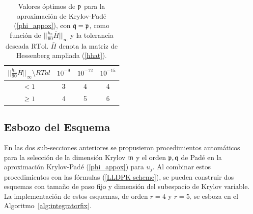 \begin{table}[htb]
	\caption{Valores óptimos de $\mathfrak{p}$ para la aproximación de Krylov-Padé (\ref{phi_appox}), con $\mathfrak{q}=\mathfrak{p}$, como función de $\lvert\lvert \frac{h_n}{90}\overline{H} \rvert\rvert_\infty$ y la tolerancia deseada $\mathrm{RTol}$. $\overline{H}$ denota la matriz de Hessenberg ampliada (\ref{hhat}).}
	\begin{center}
		\begin{tabular}{cccc}
			\hline
			$\lvert\lvert \frac{h_n}{90}\overline{H} \rvert\rvert_\infty \setminus RTol$ & $10^{-9}$ & $10^{-12}$ & $10^{-15}$ \\
			\hline
			$<1$ & 3 & 4 & 4 \\
			$\geq 1$ & 4 & 5 & 6 \\
			\hline
		\end{tabular}
		\label{table:padep}
	\end{center}
\end{table}

\subsection{Esbozo del Esquema}

En las dos sub-secciones anteriores se propusieron procedimientos automáticos para la selección de la dimensión Krylov $\mathfrak{m}$ y el orden $\mathfrak{p},\mathfrak{q}$ de Padé en la aproximación Krylov-Padé (\ref{phi_appox}) para $u_j$. Al combinar estos procedimientos con las fórmulas (\ref{LLDPK scheme}), se pueden construir dos esquemas con tamaño de paso fijo y dimensión del subespacio de Krylov variable. La implementación de estos esquemas, de orden $r=4$ y $r=5$, se esboza en el Algoritmo~\ref{alg:integratorfix}.


